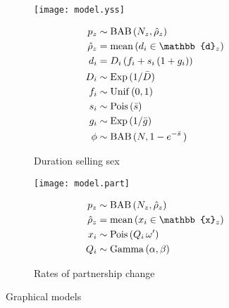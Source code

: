 \begin{figure}[h]
  \begin{subfigure}{\textwidth}
    \begin{minipage}{.5\textwidth}
      \centering\texttt{[image: model.yss]}
    \end{minipage}
    \begin{minipage}{.5\textwidth}
      \begin{align}
           p_z &\sim \distr{BAB}{N_z, \hat{\rho}_z} \\
  \hat{\rho}_z &=    \distr{mean}{d_i \in \mathbb{d}_z} \\
           d_i &=    D_i\,(f_i + s_i\,(1 + g_i)) \\
           D_i &\sim \distr{Exp}{1/\bar{D}} \\
           f_i &\sim \distr{Unif}{0,1} \\
           s_i &\sim \distr{Pois}{\bar{s}} \\
           g_i &\sim \distr{Exp}{1/\bar{g}} \\
          \phi &\sim \distr{BAB}{N, 1-e^{-\bar{s}}\,}
      \end{align}
    \end{minipage}
    \caption{Duration selling sex}
    \label{fig:model.yss}
  \end{subfigure}
  \begin{subfigure}{\textwidth}
    \begin{minipage}{.5\textwidth}
      \centering\texttt{[image: model.part]}
    \end{minipage}
    \begin{minipage}{.5\textwidth}
      \begin{align}
           p_z &\sim \distr{BAB}{N_z, \hat{\rho}_z} \\
  \hat{\rho}_z &=    \distr{mean}{x_i \in \mathbb{x}_z} \\
           x_i &\sim \distr{Pois}{Q_i\,\omega'} \\
           Q_i &\sim \distr{Gamma}{\alpha,\beta}
      \end{align}
    \end{minipage}
    \caption{Rates of partnership change}
    \label{fig:model.part}
  \end{subfigure}
  \caption{Graphical models}
\end{figure}
